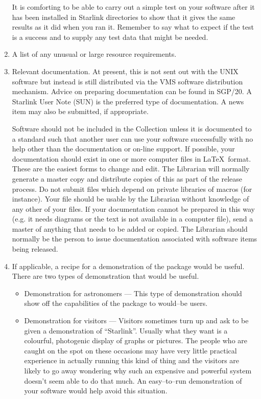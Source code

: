 \begin{enumerate}
It is comforting to be able to carry out a simple test on your software
after it has been installed in Starlink directories to show that it gives the
same results as it did when you ran it.
Remember to say what to expect if the test is a success and to supply any test
data that might be needed.

\item A list of any unusual or large resource requirements.

\item Relevant documentation. At present, this is not sent out with the
UNIX software but instead is still distributed via the VMS software
distribution mechanism. Advice on preparing documentation can be found in 
SGP/20. A Starlink User Note (SUN) is the preferred type of documentation.
A news item may also be submitted, if appropriate.

Software should not be included in the Collection unless it is documented
to a standard such that another user can use your software successfully with no
help other than the documentation or on-line support.
If possible, your documentation should exist in one or more computer files in
\LaTeX\ format.
These are the easiest forms to change and edit.
The Librarian will normally generate a master copy and distribute copies of this
as part of the release process.
Do not submit files which depend on private libraries of macros (for instance). 
Your file should be usable by the Librarian without knowledge of any other of
your files.
If your documentation cannot be prepared in this way (e.g. it needs diagrams or
the text is not available in a computer file), send a master of anything that
needs to be added or copied.
The Librarian should normally be the person to issue documentation associated
with software items being released.


\item If applicable, a recipe for a demonstration of the package would be
useful. There are two types of demonstration that would be useful. 

\begin{itemize}

\item Demonstration for astronomers --- This type of demonstration should
show off the capabilities of the package to would--be users. 

\item Demonstration for visitors ---
Visitors sometimes turn up and ask to be given a demonstration of
``Starlink''. Usually what they want is a colourful, photogenic display of
graphs or pictures. The people who are caught on the spot on these occasions
may have very little practical experience in actually running this kind of
thing and the visitors are likely to go away wondering why such an expensive
and powerful system doesn't seem able to do that much. An easy--to--run 
demonstration of your software would help avoid this situation.


\end{itemize}
\end{enumerate}
